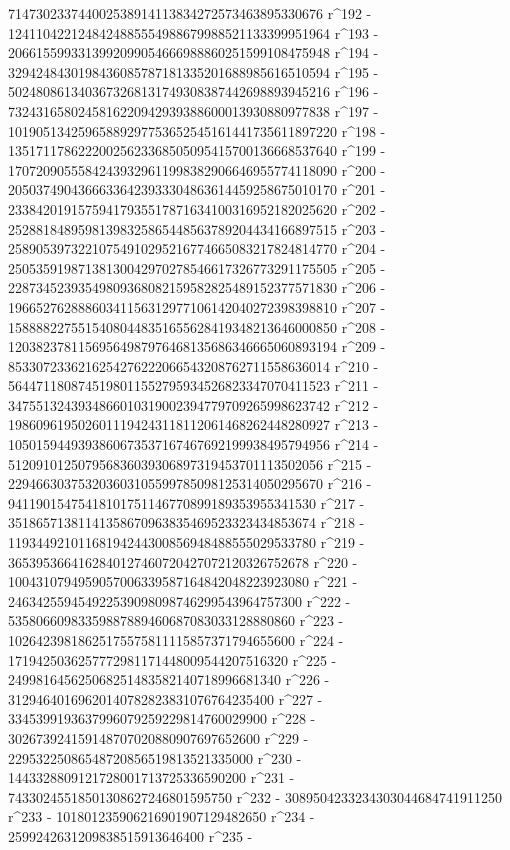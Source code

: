        714730233744002538914113834272573463895330676 r^192 - 
       1241104221248424885554988679988521133399951964 r^193 - 
       2066155993313992099054666988860251599108475948 r^194 - 
       3294248430198436085787181335201688985616510594 r^195 - 
       5024808613403673268131749308387442698893945216 r^196 - 
       7324316580245816220942939388600013930880977838 r^197 - 
       10190513425965889297753652545161441735611897220 r^198 - 
       13517117862220025623368505095415700136668537640 r^199 - 
       17072090555842439329611998382906646955774118090 r^200 - 
       20503749043666336423933304863614459258675010170 r^201 - 
       23384201915759417935517871634100316952182025620 r^202 - 
       25288184895981398325865448563789204434166897515 r^203 - 
       25890539732210754910295216774665083217824814770 r^204 - 
       25053591987138130042970278546617326773291175505 r^205 - 
       22873452393549809368082159582825489152377571830 r^206 - 
       19665276288860341156312977106142040272398398810 r^207 - 
       15888822755154080448351655628419348213646000850 r^208 - 
       12038237811569564987976468135686346665060893194 r^209 - 
       8533072336216254276222066543208762711558636014 r^210 - 
       5644711808745198011552795934526823347070411523 r^211 - 
       3475513243934866010319002394779709265998623742 r^212 - 
       1986096195026011194243118112061468262448280927 r^213 - 
       1050159449393860673537167467692199938495794956 r^214 - 
       512091012507956836039306897319453701113502056 r^215 - 
       229466303753203603105599785098125314050295670 r^216 - 
       94119015475418101751146770899189353955341530 r^217 - 
       35186571381141358670963835469523323434853674 r^218 - 
       11934492101168194244300856948488555029533780 r^219 - 
       3653953664162840127460720427072120326752678 r^220 - 
       1004310794959057006339587164842048223923080 r^221 - 
       246342559454922539098098746299543964757300 r^222 - 
       53580660983359887889460687083033128880860 r^223 - 
       10264239818625175575811115857371794655600 r^224 - 
       1719425036257772981171448009544207516320 r^225 - 
       249981645625068251483582140718996681340 r^226 - 
       31294640169620140782823831076764235400 r^227 - 
       3345399193637996079259229814760029900 r^228 - 
       302673924159148707020880907697652600 r^229 - 
       22953225086548720856519813521335000 r^230 - 
       1443328809121728001713725336590200 r^231 - 
       74330245518501308627246801595750 r^232 - 
       3089504233234303044684741911250 r^233 - 
       101801235906216901907129482650 r^234 - 
       2599242631209838515913646400 r^235 - 

